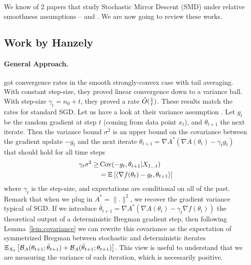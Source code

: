 \documentclass{article}
\newcommand*{\expect}[2][]{\ensuremath{\mathbb{E}_{#1} \left[ #2 \right] }} %
\newcommand{\logpart}{A}
\newcommand{\conj}{\logpart^*}
\newcommand{\bregman}{\cB_\logpart}
\newcommand{\natp}{\theta}
\newcommand{\lr}{\gamma} %
\begin{document}
We know of 2 papers that study Stochastic Mirror Descent (SMD) under relative smoothness assumptions -- \citet{hanzely2018fastest} and \citet{dragomir2021fast}. We are now going to review these works.

\subsection{Work by Hanzely}

\paragraph{General Approach.} 
\citet{hanzely2018fastest} got convergence rates in the smooth strongly-convex case with tail averaging. With constant step-size, they proved linear convergence down to a variance ball. With step-size $\gamma_t = n_0 + t$, they proved a rate $\tilde O(\frac{1}{t})$. These results match the rates for standard SGD.
Let us have a look at their variance assumption \citep[Assumption 5.1]{hanzely2018fastest}.
Let $g_t$ be the random gradient at step $t$  (coming from data point $x_t$), and $\natp_{t+1}$ the next iterate. Then the variance bound $\sigma^2$ is an upper bound on the covariance between the gradient update  $-g_t$ and the next iterate $\natp_{t+1} = \nabla \logpart^*(\nabla \logpart(\natp_t) - \lr_t g_t )$ that should hold for all time steps  
\begin{align}
	\lr_t \sigma^2 \geq 
	&\Cov(- g_t,\natp_{t+1} | X_{1 \dots t})  \label{eq:hanzely_hypothesis} \\
	 &= \expect{\langle \nabla f(\natp_t) - g_t , \natp_{t+1}  \rangle}
\end{align}
where $\gamma_t$ is the step-size, and expectations are conditional on all of the past. 
Remark that when we plug in $\conj = \|.\|^2$, we recover the gradient variance typical of SGD. 
If we introduce $\bar \natp_{t+1}=\nabla \logpart^*(\nabla \logpart(\natp_t) - \lr_t  \nabla f(\natp_t) )$ the theoretical output of a deterministic Bregman gradient step, then following Lemma~\ref{lem:covariance} we can rewrite this covariance as the expectation of symmetrized Bregman between stochastic and deterministic iterates $\expect[X_t]{\bregman(\natp_{t+1} ; \bar \natp_{t+1} ) + \bregman(\bar \natp_{t+1} ; \natp_{t+1} ) }$.
This view is useful to understand that we are measuring the variance of each iteration, which is necessarily positive.
\end{document}
